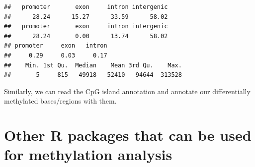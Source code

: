\documentclass[12pt,]{krantz}
\newenvironment{Shaded}{\begin{snugshade}}{\end{snugshade}}
\newcommand{\CommentTok}[1]{\textcolor[rgb]{0.56,0.35,0.01}{\textit{#1}}}
\newcommand{\DataTypeTok}[1]{\textcolor[rgb]{0.13,0.29,0.53}{#1}}
\newcommand{\KeywordTok}[1]{\textcolor[rgb]{0.13,0.29,0.53}{\textbf{#1}}}
\newcommand{\NormalTok}[1]{#1}
\newcommand{\OperatorTok}[1]{\textcolor[rgb]{0.81,0.36,0.00}{\textbf{#1}}}
\newcommand{\StringTok}[1]{\textcolor[rgb]{0.31,0.60,0.02}{#1}}
\begin{document}
\begin{verbatim}
##   promoter       exon     intron intergenic 
##      28.24      15.27      33.59      58.02 
##   promoter       exon     intron intergenic 
##      28.24       0.00      13.74      58.02 
## promoter     exon   intron 
##     0.29     0.03     0.17 
##    Min. 1st Qu.  Median    Mean 3rd Qu.    Max. 
##       5     815   49918   52410   94644  313528
\end{verbatim}

Similarly, we can read the CpG island annotation and annotate our differentially methylated bases/regions with them.

\begin{Shaded}
\end{Shaded}

\hypertarget{other-r-packages-that-can-be-used-for-methylation-analysis}{%
\section{Other R packages that can be used for methylation analysis}\label{other-r-packages-that-can-be-used-for-methylation-analysis}}
\end{document}

